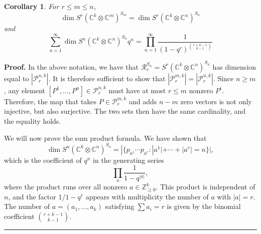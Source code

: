 \documentclass[12pt]{article}%
\newtheorem{corollary}[theorem]{Corollary}
\newenvironment{proof}[1][Proof]{\noindent\textbf{#1.} }{\ \rule{0.5em}{0.5em}}
\begin{document}
\begin{corollary}
\label{dimthm}For $r\leq m\leq n$,
\[
\dim S^{r}(\mathbb{C}^{k}\otimes\mathbb{C}^{m})^{S_{m}}=\dim S^{r}%
(\mathbb{C}^{k}\otimes\mathbb{C}^{n})^{S_{n}}%
\]
and
\[
\sum_{n=1}^{\infty}\dim S^{n}(\mathbb{C}^{k}\otimes\mathbb{C}^{n})^{S_{n}%
}q^{n}=%
{\displaystyle\prod_{n=1}^{\infty}}
\frac{1}{(1-q^{r})^{\binom{r+k-1}{k-1}}}%
\]

\end{corollary}

\begin{proof}
In the above notation, we have that $\mathcal{R}_{r}^{S_{n}}=S^{r}%
(\mathbb{C}^{k}\otimes\mathbb{C}^{n})^{S_{n}}$ has dimension equal to
$|\mathcal{P}_{r}^{n,k}|$. It is therefore sufficient to show that
$|\mathcal{P}_{r}^{m,k}|=|\mathcal{P}_{r}^{n,k}|$. Since $n\geq m$, any
element $[P^{1},\dots,P^{n}]\in\mathcal{P}_{r}^{n,k}$ must have at most $r
\leq m$ nonzero $P^{i}$. Therefore, the map that takes $P\in\mathcal{P}%
_{r}^{m,k}$ and adds $n-m$ zero vectors is not only injective, but also
surjective. The two sets then have the same cardinality, and the equality holds.

We will now prove the sum product formula. We have shown that
\[
\dim S^{n}(\mathbb{C}^{k}\otimes\mathbb{C}^{n})^{S_{n}}=|\{p_{a^{1}}\cdots
p_{a^{r}}:|a^{1}|+\cdots+|a^{r}|=n\}|,
\]
which is the coefficient of $q^{n}$ in the generating series
\[
\prod_{a}\frac{1}{1-q^{|a|}},
\]
where the product runs over all nonzero $a\in\mathbb{Z}_{\geq 0}^{k}$. This product is
independent of $n$, and the factor $1/1-q^{r}$ appears with multiplicity the
number of $a$ with $|a|=r$. The number of $a=(a_{1},...,a_{k})$ satisfying
$\sum a_{i}=r$ is given by the binomial coefficient $\binom{r+k-1}{k-1}$.
\end{proof}
\end{document}
